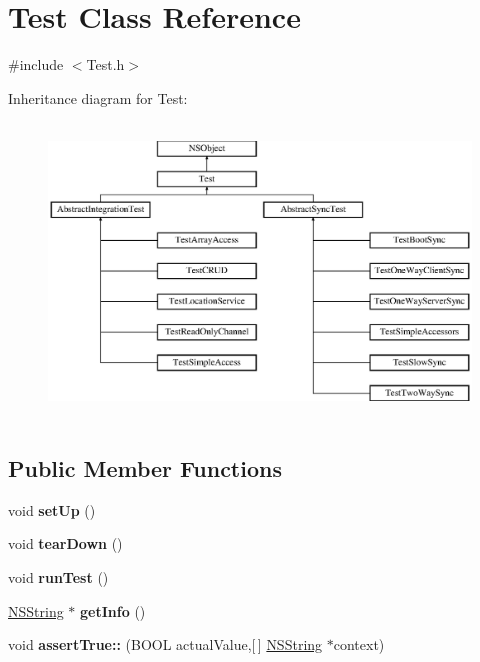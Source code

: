 \hypertarget{interface_test}{
\section{\-Test \-Class \-Reference}
\label{interface_test}
}


{\ttfamily \#include $<$\-Test.\-h$>$}

\-Inheritance diagram for \-Test\-:\begin{figure}[H]
\begin{center}
\leavevmode
\includegraphics[height=7.875000cm]{interface_test}
\end{center}
\end{figure}
\subsection*{\-Public \-Member \-Functions}
\begin{DoxyCompactItemize}
\item 
\hypertarget{interface_test_a760ec175e6e90406061ce0acbcc6e138}{
void {\bfseries set\-Up} ()}
\label{interface_test_a760ec175e6e90406061ce0acbcc6e138}

\item 
\hypertarget{interface_test_a94c6ddb4188e0945b0450ed1591ba3ed}{
void {\bfseries tear\-Down} ()}
\label{interface_test_a94c6ddb4188e0945b0450ed1591ba3ed}

\item 
\hypertarget{interface_test_a4b61a484928fcecf041041f0adcf7830}{
void {\bfseries run\-Test} ()}
\label{interface_test_a4b61a484928fcecf041041f0adcf7830}

\item 
\hypertarget{interface_test_ae4dc201a74175fe53c1a84a2bb7cce13}{
\hyperlink{class_n_s_string}{\-N\-S\-String} $\ast$ {\bfseries get\-Info} ()}
\label{interface_test_ae4dc201a74175fe53c1a84a2bb7cce13}

\item 
\hypertarget{interface_test_a8a004bd8b5d74c17eace9cd01678f7e1}{
void {\bfseries assert\-True\-::} (\-B\-O\-O\-L actual\-Value,\mbox{[}$\,$\mbox{]} \hyperlink{class_n_s_string}{\-N\-S\-String} $\ast$context)}
\label{interface_test_a8a004bd8b5d74c17eace9cd01678f7e1}

\end{DoxyCompactItemize}
